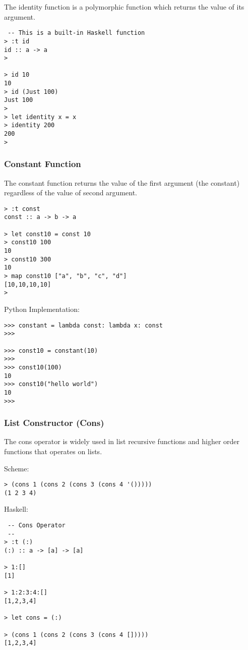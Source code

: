 \documentclass[11pt]{article}
\begin{document}
The identity function is a polymorphic function which returns the
value of its argument.

\begin{verbatim}
 -- This is a built-in Haskell function 
> :t id
id :: a -> a
> 

> id 10 
10
> id (Just 100)
Just 100
> 
> let identity x = x
> identity 200 
200
>
\end{verbatim}

\subsubsection{Constant Function}
\label{sec-1-10-2}

The constant function returns the value of the first argument (the
constant) regardless of the value of second argument.

\begin{verbatim}
> :t const
const :: a -> b -> a

> let const10 = const 10 
> const10 100 
10
> const10 300
10
> map const10 ["a", "b", "c", "d"]
[10,10,10,10]
>
\end{verbatim}

Python Implementation:

\begin{verbatim}
>>> constant = lambda const: lambda x: const
>>> 

>>> const10 = constant(10)
>>> 
>>> const10(100)
10
>>> const10("hello world")
10
>>>
\end{verbatim}

\subsubsection{List Constructor (Cons)}
\label{sec-1-10-3}

The cons operator is widely used in list recursive functions and
higher order functions that operates on lists. 

Scheme: 

\begin{verbatim}
> (cons 1 (cons 2 (cons 3 (cons 4 '()))))
(1 2 3 4)
\end{verbatim}


Haskell:

\begin{verbatim}
 -- Cons Operator 
 -- 
> :t (:)
(:) :: a -> [a] -> [a]

> 1:[]
[1]

> 1:2:3:4:[]
[1,2,3,4]

> let cons = (:)

> (cons 1 (cons 2 (cons 3 (cons 4 []))))
[1,2,3,4]
\end{verbatim}
\end{document}
